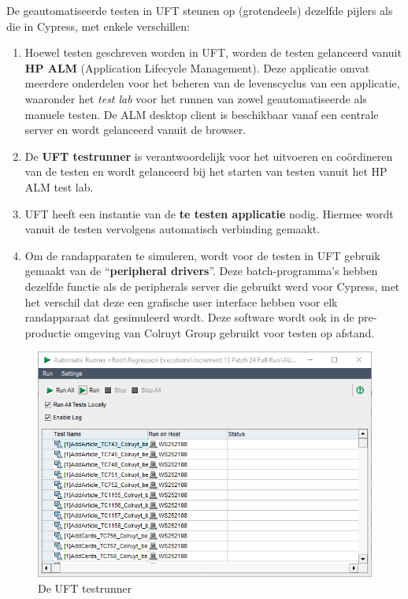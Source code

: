 De geautomatiseerde testen in UFT steunen op (grotendeels) dezelfde pijlers als die in Cypress, met enkele verschillen:

\begin{enumerate}
    \item Hoewel testen geschreven worden in UFT, worden de testen gelanceerd vanuit \textbf{HP ALM} (Application Lifecycle Management). Deze applicatie omvat meerdere onderdelen voor het beheren van de levenscyclus van een applicatie, waaronder het \emph{test lab} voor het runnen van zowel geautomatiseerde als manuele testen. De ALM desktop client is beschikbaar vanaf een centrale server en wordt gelanceerd vanuit de browser.
    \item De \textbf{UFT testrunner} is verantwoordelijk voor het uitvoeren en coördineren van de testen en wordt gelanceerd bij het starten van testen vanuit het HP ALM test lab.
    \item UFT heeft een instantie van de \textbf{te testen applicatie} nodig. Hiermee wordt vanuit de testen vervolgens automatisch verbinding gemaakt.
    \item Om de randapparaten te simuleren, wordt voor de testen in UFT gebruik gemaakt van de ``\textbf{peripheral drivers}''. Deze batch-programma's hebben dezelfde functie als de peripherals server die gebruikt werd voor Cypress, met het verschil dat deze een grafische user interface hebben voor elk randapparaat dat gesimuleerd wordt. Deze software wordt ook in de pre-productie omgeving van Colruyt Group gebruikt voor testen op afstand.
\end{enumerate}

\begin{figure}[h!]
    \centering
    \includegraphics[scale=0.35]{img/corpus/uft-runner.PNG}
    \caption{De UFT testrunner}
    \label{fig:uft-testrunner}
\end{figure}

